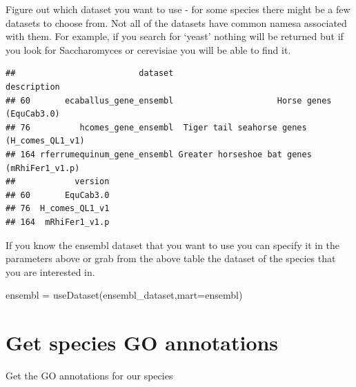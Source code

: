 \documentclass[
]{book}
\newenvironment{Shaded}{\begin{snugshade}}{\end{snugshade}}
\newcommand{\AttributeTok}[1]{\textcolor[rgb]{0.77,0.63,0.00}{#1}}
\newcommand{\CommentTok}[1]{\textcolor[rgb]{0.56,0.35,0.01}{\textit{#1}}}
\newcommand{\ConstantTok}[1]{\textcolor[rgb]{0.00,0.00,0.00}{#1}}
\newcommand{\FunctionTok}[1]{\textcolor[rgb]{0.00,0.00,0.00}{#1}}
\newcommand{\NormalTok}[1]{#1}
\newcommand{\OtherTok}[1]{\textcolor[rgb]{0.56,0.35,0.01}{#1}}
\newcommand{\SpecialCharTok}[1]{\textcolor[rgb]{0.00,0.00,0.00}{#1}}
\begin{document}
Figure out which dataset you want to use - for some species there might be a few datasets to choose from. Not all of the datasets have common namesa associated with them. For example, if you search for `yeast' nothing will be returned but if you look for Saccharomyces or cerevisiae you will be able to find it.

\begin{Shaded}
\end{Shaded}

\begin{verbatim}
##                         dataset                                 description
## 60       ecaballus_gene_ensembl                     Horse genes (EquCab3.0)
## 76          hcomes_gene_ensembl  Tiger tail seahorse genes (H_comes_QL1_v1)
## 164 rferrumequinum_gene_ensembl Greater horseshoe bat genes (mRhiFer1_v1.p)
##            version
## 60       EquCab3.0
## 76  H_comes_QL1_v1
## 164  mRhiFer1_v1.p
\end{verbatim}

If you know the ensembl dataset that you want to use you can specify it in the parameters above or grab from the above table the dataset of the species that you are interested in.

\begin{Shaded}
\begin{Highlighting}[]
\NormalTok{ensembl }\OtherTok{=} \FunctionTok{useDataset}\NormalTok{(ensembl\_dataset,}\AttributeTok{mart=}\NormalTok{ensembl)}
\end{Highlighting}
\end{Shaded}

\hypertarget{get-species-go-annotations}{%
\section{Get species GO annotations}\label{get-species-go-annotations}}

Get the GO annotations for our species
\end{document}
